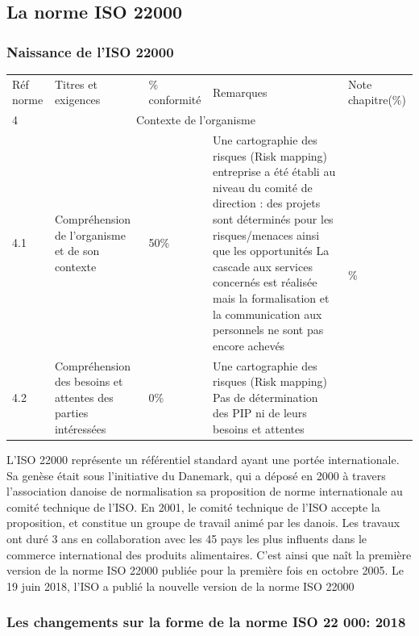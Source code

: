 \begin{spacing}{1.2}
\subsection{La norme ISO 22000}

\subsubsection{Naissance de l’ISO 22000}

\begin{landscape}
\begin{longtable}{  | p{2cm} | p{5cm} | p{2cm} | p{9cm} | p{2cm}| }
\hline\endhead  %
\hline\endfoot  %
 Réf norme & Titres et exigences &  \% conformité & Remarques  & Note chapitre(\%) \\
  \cline{1-5}
 4 &  \multicolumn{3}{|c|}{Contexte de l’organisme} & \multirow{3}{*}{\centering 37.7\%} \\
  \cline{1-4}
 4.1 & Compréhension de l’organisme et de son contexte & 50\% & Une cartographie des risques (Risk mapping) entreprise a été établi au niveau du comité de direction : des projets sont déterminés pour les risques/menaces ainsi que les opportunités
La cascade aux services concernés est réalisée mais la formalisation et la communication aux personnels ne sont  pas encore achevés &   \\
  \cline{1-4}
 4.2 & Compréhension des besoins et attentes des parties intéressées & 0\% & Une cartographie des risques (Risk mapping)  Pas de détermination des PIP ni de leurs besoins et attentes  &  \\
\end{longtable}
\end{landscape}


L’ISO 22000  représente un référentiel standard ayant une portée internationale. Sa genèse était sous l’initiative du Danemark, qui a déposé en 2000 à travers  l’association danoise de normalisation sa proposition de norme internationale au comité technique de l’ISO. En 2001, le comité technique de l’ISO accepte la proposition, et constitue un groupe de travail animé par les danois. Les travaux ont duré 3 ans en collaboration avec les 45 pays les plus influents dans le commerce international des produits alimentaires. C’est ainsi que naît la première version de la norme ISO 22000 publiée pour la première fois en octobre 2005. Le 19 juin 2018, l’ISO a publié la nouvelle version de la norme ISO 22000
\subsubsection{Les changements sur la forme de la norme ISO 22 000: 2018}


\end{spacing}
